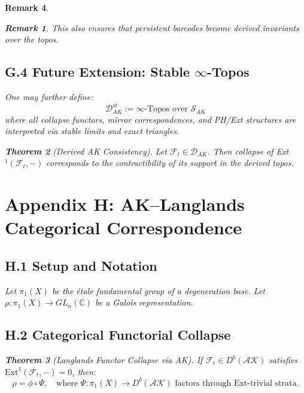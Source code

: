 \documentclass[11pt]{article}
\newtheorem{theorem}{Theorem}[section]
\newtheorem{remark}[theorem]{Remark}
\begin{document}
\begin{remark}
\begin{remark}
This also ensures that persistent barcodes become derived invariants over the topos.
\end{remark}

\subsection*{G.4 Future Extension: Stable $\infty$-Topos}

One may further define:
\[
\mathcal{D}^{st}_{AK} := \infty\text{-Topos over } \mathcal{S}_{AK}
\]
where all collapse functors, mirror correspondences, and PH/Ext structures are interpreted via stable limits and exact triangles.

\begin{theorem}[Derived AK Consistency]
Let \( \mathcal{F}_t \in \mathcal{D}_{AK} \). Then collapse of Ext$^1(\mathcal{F}_t, -)$ corresponds to the contractibility of its support in the derived topos.
\end{theorem}

\section*{Appendix H: AK–Langlands Categorical Correspondence}

\subsection*{H.1 Setup and Notation}
Let $\pi_1(X)$ be the étale fundamental group of a degeneration base. Let $\rho: \pi_1(X) \to GL_n(\mathbb{C})$ be a Galois representation.

\subsection*{H.2 Categorical Functorial Collapse}

\begin{theorem}[Langlands Functor Collapse via AK]
If $\mathcal{F}_t \in D^b(\mathcal{AK})$ satisfies $\mathrm{Ext}^1(\mathcal{F}_t, -) = 0$, then:
\[
\rho = \phi \circ \Psi, \quad \text{where } \Psi: \pi_1(X) \to D^b(\mathcal{AK}) \text{ factors through Ext-trivial strata.}
\]
\end{theorem}


\end{remark}
\end{document}
